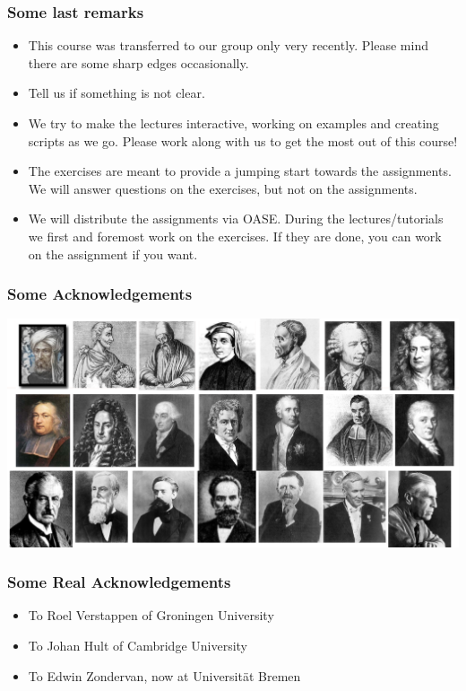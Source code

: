 \documentclass[11pt,table,final,fleqn,xcolor={usenames,dvipsnames}]{beamer}
\begin{document}
\begin{frame}
 \frametitle{Some last remarks}
  \begin{itemize}
   \item This course was transferred to our group only very recently. Please mind there are some sharp edges occasionally.
   \item Tell us if something is not clear.
   \item We try to make the lectures interactive, working on examples and creating scripts as we go. Please work along with us to get the most out of this course!
   \item The exercises are meant to provide a jumping start towards the assignments. We will answer questions on the exercises, but not on the assignments. 
   \item We will distribute the assignments via OASE. During the lectures/tutorials we first and foremost work on the exercises. If they are done, you can work on the assignment if you want.
   \end{itemize} 
\end{frame}

 
\begin{frame}
 \frametitle{Some Acknowledgements}
 \centering\includegraphics[width=\textwidth]{img/ack.png}
\end{frame}

\begin{frame}
 \frametitle{Some Real Acknowledgements}
 \begin{itemize}
  \item To Roel Verstappen of Groningen University
  \item To Johan Hult of Cambridge University
  \item To Edwin Zondervan, now at Universität Bremen
 \end{itemize}
\end{frame}
\end{document}
